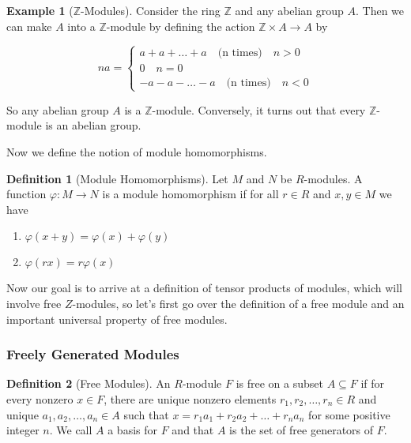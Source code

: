 \documentclass[11pt]{article}
\theoremstyle{definition}
\newtheorem*{defn}{Definition}
\theoremstyle{plain}
\theoremstyle{plain}
\theoremstyle{plain}
\theoremstyle{definition}
\newtheorem{ex}{Example}
\begin{document}
\begin{ex}[$\mathbb{Z}$-Modules]
Consider the ring $\mathbb{Z}$ and any abelian group $A$. Then we can make $A$ into a $\mathbb{Z}$-module by defining the action $\mathbb{Z} \times A \to A$ by

\begin{equation*}
na = \left\{
	\begin{array}{rr}
		a + a + \dots + a \quad \text{(n times)} \quad n > 0 \\
		0 \quad n = 0 \\
		-a - a - \dots -a \quad \text{(n times)} \quad n < 0
	\end{array}
\right.
\end{equation*}

So any abelian group $A$ is a $\mathbb{Z}$-module. Conversely, it turns out that every $\mathbb{Z}$-module is an abelian group.
\end{ex}

Now we define the notion of module homomorphisms.

\begin{defn}[Module Homomorphisms]
Let $M$ and $N$ be $R$-modules. A function $\varphi: M \to N$ is a module homomorphism if for all $r \in R$ and $x, y \in M$ we have

\begin{enumerate}
\item $\varphi(x + y) = \varphi(x) + \varphi(y)$
\item $\varphi(rx) = r\varphi(x)$
\end{enumerate}
\end{defn}

Now our goal is to arrive at a definition of tensor products of modules, which will involve free $Z$-modules, so let's first go over the definition of a free module and an important universal property of free modules.

\subsubsection*{Freely Generated Modules}

\begin{defn}[Free Modules]
An $R$-module $F$ is free on a subset $A \subseteq F$ if for every nonzero $x \in F$, there are unique nonzero elements $r_1, r_2, \dots, r_n \in R$ and unique $a_1, a_2, \dots, a_n \in A$ such that $x = r_1a_1 + r_2a_2 + \dots+ r_na_n$ for some positive integer $n$. We call $A$ a basis for $F$ and that $A$ is the set of free generators of $F$.
\end{defn}
\end{document}
